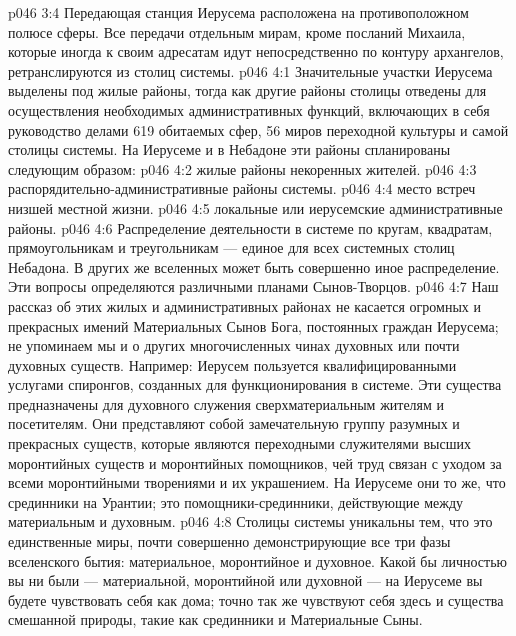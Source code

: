 \vs p046 3:4 \pc Передающая станция Иерусема расположена на противоположном полюсе сферы. Все передачи отдельным мирам, кроме посланий Михаила, которые иногда к своим адресатам идут непосредственно по контуру архангелов, ретранслируются из столиц системы.
\vs p046 4:1 Значительные участки Иерусема выделены под жилые районы, тогда как другие районы столицы отведены для осуществления необходимых административных функций, включающих в себя руководство делами 619 обитаемых сфер, 56 миров переходной культуры и самой столицы системы. На Иерусеме и в Небадоне эти районы спланированы следующим образом:
\vs p046 4:2 \bibnobreakspace {} жилые районы некоренных жителей.
\vs p046 4:3 \bibnobreakspace {} распорядительно\hyp{}административные районы системы.
\vs p046 4:4 \bibnobreakspace {} место встреч низшей местной жизни.
\vs p046 4:5 \bibnobreakspace {} локальные или иерусемские административные районы.
\vs p046 4:6 \pc Распределение деятельности в системе по кругам, квадратам, прямоугольникам и треугольникам --- единое для всех системных столиц Небадона. В других же вселенных может быть совершенно иное распределение. Эти вопросы определяются различными планами Сынов\hyp{}Творцов.
\vs p046 4:7 \pc Наш рассказ об этих жилых и административных районах не касается огромных и прекрасных имений Материальных Сынов Бога, постоянных граждан Иерусема; не упоминаем мы и о других многочисленных чинах духовных или почти духовных существ. Например: Иерусем пользуется квалифицированными услугами спиронгов, созданных для функционирования в системе. Эти существа предназначены для духовного служения сверхматериальным жителям и посетителям. Они представляют собой замечательную группу разумных и прекрасных существ, которые являются переходными служителями высших моронтийных существ и моронтийных помощников, чей труд связан с уходом за всеми моронтийными творениями и их украшением. На Иерусеме они то же, что срединники на Урантии; это помощники\hyp{}срединники, действующие между материальным и духовным.
\vs p046 4:8 Столицы системы уникальны тем, что это единственные миры, почти совершенно демонстрирующие все три фазы вселенского бытия: материальное, моронтийное и духовное. Какой бы личностью вы ни были --- материальной, моронтийной или духовной --- на Иерусеме вы будете чувствовать себя как дома; точно так же чувствуют себя здесь и существа смешанной природы, такие как срединники и Материальные Сыны.
